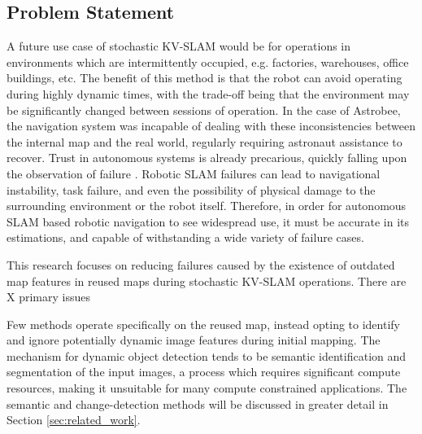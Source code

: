 \subsection{Problem Statement}

A future use case of stochastic KV-SLAM would be for operations in environments which are intermittently occupied, e.g. factories, warehouses, office buildings, etc. The benefit of this method is that the robot can avoid operating during highly dynamic times, with the trade-off being that the environment may be significantly changed between sessions of operation. In the case of Astrobee, the navigation system was incapable of dealing with these inconsistencies between the internal map and the real world, regularly requiring astronaut assistance to recover. Trust in autonomous systems is already precarious, quickly falling upon the observation of failure \cite{robinetteEffectRobotPerformance2017}. Robotic SLAM failures can lead to navigational instability, task failure, and even the possibility of physical damage to the surrounding environment or the robot itself\cite{nahavandiComprehensiveReviewAutonomous2025a}. Therefore, in order for autonomous SLAM based robotic navigation to see widespread use, it must be accurate in its estimations, and capable of withstanding a wide variety of failure cases.

This research focuses on reducing failures caused by the existence of outdated map features in reused maps during stochastic KV-SLAM operations. There are X primary issues 

Few methods operate specifically on the reused map, instead opting to identify and ignore potentially dynamic image features during initial mapping. The mechanism for dynamic object detection tends to be semantic identification and segmentation of the input images, a process which requires significant compute resources, making it unsuitable for many compute constrained applications. The semantic and change-detection methods will be discussed in greater detail in Section \ref{sec:related_work}.


